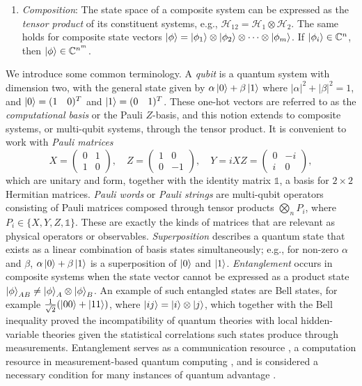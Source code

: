 \documentclass[../main.tex]{subfiles}
\begin{document}
\begin{enumerate}[align=left]
    \item[Postulate 4] \textit{Composition}: The state space of a composite system can be expressed as the \textit{tensor product} of its constituent systems, e.g., $\mathcal{H}_{12} = \mathcal{H}_{1} \otimes \mathcal{H}_{2}$. The same holds for composite state vectors 
    $\ket{\phi} = \ket{\phi_1} \otimes \ket{\phi_2} \otimes \cdots \otimes \ket{\phi_m}$. If $\ket{\phi_i} \in \mathbb{C}^{n}$, then $\ket{\phi} \in \mathbb{C}^{n^m}$.
        
\end{enumerate}

We introduce some common terminology.  A \textit{qubit} is a quantum system with dimension two, with the general state given by $\alpha \ket{0} + \beta \ket{1}$ where $|\alpha|^2 + |\beta|^2 = 1$, and $\ket{0} = (1 \quad 0)^T$ and $\ket{1} = (0 \quad 1)^T$. These one-hot vectors are referred to as the \textit{computational basis} or the Pauli $Z$-basis, and this notion extends to composite systems, or multi-qubit systems, through the tensor product. It is convenient to work with \textit{Pauli matrices}
\begin{equation}
    X = \begin{pmatrix}
        0 & 1 \\
        1 & 0 
    \end{pmatrix}, \quad
    Z =
    \begin{pmatrix}
        1 & 0 \\
        0 & -1 
    \end{pmatrix}, \quad
    Y = iXZ = 
    \begin{pmatrix}
        0 & -i \\
        i & 0
    \end{pmatrix},
\end{equation} which are unitary and form, together with the identity matrix $\mathds{1}$, a basis for $2 \times 2$ Hermitian matrices. \textit{Pauli words} or \textit{Pauli strings} are multi-qubit operators consisting of Pauli matrices composed through tensor products $\bigotimes_n P_i$, where $P_i \in \{X,Y,Z,\mathds{1} \}$. These are exactly the kinds of matrices that are relevant as physical operators or observables. \textit{Superposition} describes a quantum state that exists as a linear combination of basis states simultaneously; e.g., for non-zero $\alpha$ and $\beta$, $\alpha \ket{0} + \beta \ket{1}$ is a superposition of $\ket{0}$ and $\ket{1}$. \textit{Entanglement} occurs in composite systems when the state vector cannot be expressed as a product state $\ket{\phi}_{AB} \neq \ket{\phi}_A \otimes \ket{\phi}_B$. An example of such entangled states are Bell states, for example $\frac{1}{\sqrt{2}} (\ket{00} + \ket{11})$, where $\ket{ij} = \ket{i} \otimes \ket{j}$, which together with the Bell inequality \cite{bell1964einstein} proved the incompatibility of quantum theories with local hidden-variable theories given the statistical correlations such states produce through measurements. Entanglement serves as a communication resource \cite{ekert1991quantum}, a computation resource in measurement-based quantum computing \cite{raussendorf2003measurement}, and is considered a necessary condition for many instances of quantum advantage \cite{vidal2003efficient}.
\end{document}
